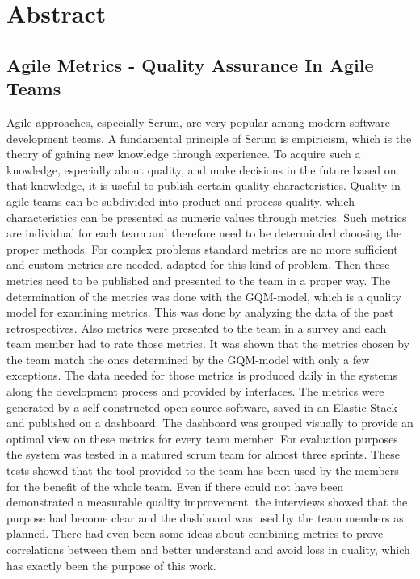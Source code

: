 \newpage
\chapter*{Abstract}
\section*{Agile Metrics {-} Quality Assurance In Agile Teams}

Agile approaches, especially Scrum, are very popular among modern software development teams.
A fundamental principle of Scrum is empiricism, which is the theory of gaining new knowledge through experience.
To acquire such a knowledge, especially about quality, and make decisions in the future based on that knowledge, it is useful to publish certain quality characteristics.
Quality in agile teams can be subdivided into product and process quality, which characteristics can be presented as numeric values through metrics.
Such metrics are individual for each team and therefore need to be determinded choosing the proper methods.
For complex problems standard metrics are no more sufficient and custom metrics are needed, adapted for this kind of problem.
Then these metrics need to be published and presented to the team in a proper way.
The determination of the metrics was done with the \ac{GQM}-model, which is a quality model for examining metrics.
This was done by analyzing the data of the past retrospectives.
Also metrics were presented to the team in a survey and each team member had to rate those metrics.
It was shown that the metrics chosen by the team match the ones determined by the \ac{GQM}-model with only a few exceptions.
The data needed for those metrics is produced daily in the systems along the development process and provided by interfaces.
The metrics were generated by a self-constructed open-source software, saved in an Elastic Stack and published on a dashboard.
The dashboard was grouped visually to provide an optimal view on these metrics for every team member.
For evaluation purposes the system was tested in a matured scrum team for almost three sprints.
These tests showed that the tool provided to the team has been used by the members for the benefit of the whole team.
Even if there could not have been demonstrated a measurable quality improvement, the interviews showed that the purpose had become clear and the dashboard was used by the team members as planned.
There had even been some ideas about combining metrics to prove correlations between them and better understand and avoid loss in quality, which has exactly been the purpose of this work.
